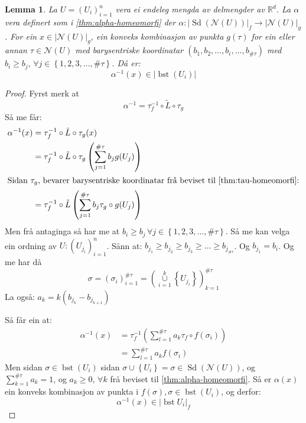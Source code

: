 \documentclass[a4paper, titlepage, 12pt, norsk]{article}
\theoremstyle{plain}
\newtheorem{lemma}[theorem]{Lemma}
\theoremstyle{definition}
\newcommand{\Rb}{\mathbb{R}}
\newcommand{\Nc}{\mathcal{N}}
\newcommand{\union}{ \mathop{\cup}\limits }
\newcommand{\gr}[1]{ \lvert #1 \rvert } %
\newcommand{\set}[1]{ \left \{ #1 \right \} } %
\newcommand{\tuple}[1]{ \left( #1 \right) } %
\DeclareMathOperator{\Sd}{Sd}
\DeclareMathOperator{\bst}{bst}
\begin{document}
\begin{lemma} \label{thm:bst-betingingar}
	La \( U = \tuple{U_i}_{i=1}^n \) vera ei endeleg mengda av delmengder av \( \Rb^d \). La \( \alpha \) vera definert som i \autoref{thm:alpha-homeomorfi} der \( \alpha: \gr{\Sd(\Nc(U))}_f \to \gr{\Nc(U)}_g \). For ein \( x \in \gr{\Nc(U)}_g \), ein konveks kombinasjon av punkta \( g(\tau) \) for ein eller annan \( \tau \in \Nc(U) \) med barysentriske koordinatar \( \tuple{b_1, b_2,\dots, b_i, \dots, b_{\#\tau}} \) med \( b_i \geq b_j, \, \forall j \in \set{1, 2, 3, \dots, \#\tau} \). Då er:
	\[ 
		\alpha^{-1}(x) \in \gr{\bst(U_i)}
	\]
\end{lemma}

\begin{proof}
	Fyrst merk at
	\[
		\alpha^{-1} = \tau_f^{-1} \circ \tilde{L} \circ \tau_g
	\]
	Så me får:
	\begin{align*}
		\alpha^{-1}(x) &= \tau_f^{-1} \circ \tilde{L} \circ \tau_g (x) \\
		&= \tau_f^{-1} \circ \tilde{L} \circ \tau_g \tuple{\sum_{j=1}^{\#\tau} b_j g(U_j)} \\
		\intertext{Sidan \( \tau_g \), bevarer barysentriske koordinatar frå beviset til \autoref{thm:tau-homeomorfi}:}
		&= \tau_f^{-1} \circ \tilde{L} \tuple{\sum_{j=1}^{\#\tau} b_j \tau_g \circ g(U_j)} \\
	\end{align*}
	Men frå antaginga så har me at \( b_i \geq b_j \, \forall j \in \set{1, 2, 3, \dots, \#\tau} \). Så me kan velga ein ordning av \( U : \tuple{U_{j_i}}_{i=1}^n \). Sånn at: \( b_{j_1} \geq b_{j_2} \geq b_{j_3} \geq \dots \geq b_{j_{\#\tau}} \). Og \( b_{j_1}=b_i \). Og me har då 
	\[
		\sigma = \tuple{\sigma_i}_{i=1}^{\#\tau} = \tuple{\union_{i=1}^k \set{U_{j_i}}}_{k=1}^{\#\tau} 
	\]
	La også: \( a_k = k\tuple{b_{j_k}-b_{j_{k+1}}} \)

	Så får ein at:
	\begin{align*}
		\alpha^{-1}(x) &= \tau_f^{-1} \tuple{\sum_{l=1}^{\#\tau}a_k \tau_f \circ f(\sigma_i)} \\
		&= \sum_{l=1}^{\#\tau} a_k f(\sigma_i)
	\end{align*}
	Men sidan \( \sigma \in \bst(U_i) \) sidan \( \sigma \union \set{U_i} = \sigma \in \Sd(\Nc(U)) \), og \( \sum_{k=1}^{\#\tau} a_k = 1 \), og \( a_k \geq 0, \, \forall k \) frå beviset til \autoref{thm:alpha-homeomorfi}. Så er \( \alpha(x) \) ein konveks kombinasjon av punkta i \( f(\sigma), \sigma \in \bst(U_i) \), og derfor:
	\[
		\alpha^{-1}(x) \in \gr{\bst{U_i}}_f
	\]
\end{proof}
\end{document}
